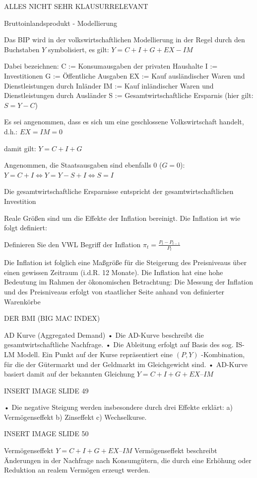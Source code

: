 ALLES NICHT SEHR KLAUSURRELEVANT

Bruttoinlandsprodukt - Modellierung

Das BIP wird in der volkswirtschaftlichen Modellierung in der Regel durch den Buchstaben \( Y \) symbolisiert, es gilt:
\(
Y = C + I + G + EX - IM
\)

Dabei bezeichnen:
C := Konsumausgaben der privaten Haushalte
I := Investitionen
G := Öffentliche Ausgaben
EX := Kauf ausländischer Waren und Dienstleistungen durch Inländer
IM := Kauf inländischer Waren und Dienstleistungen durch Ausländer
S := Gesamtwirtschaftliche Ersparnis (hier gilt: \( S = Y - C \))

Es sei angenommen, dass es sich um eine geschlossene Volkswirtschaft handelt, d.h.: \(EX = IM = 0\)

damit gilt: \(Y = C + I + G\)

Angenommen, die Staatsausgaben sind ebenfalls 0 (\( G = 0 \)): \(Y = C + I \iff Y = Y - S + I \iff S = I\)

Die gesamtwirtschaftliche Ersparnisse entspricht der
gesamtwirtschaftlichen Investition

Reale Größen sind um die Effekte der Inflation bereinigt. Die Inflation ist wie folgt definiert:


Definieren Sie den VWL Begriff der Inflation
\( \pi_t = \frac{P_t - P_{t-1}}{P_t} \)

Die Inflation ist folglich eine Maßgröße für die Steigerung des Preisniveaus über einen gewissen Zeitraum (i.d.R. 12 Monate).
Die Inflation hat eine hohe Bedeutung im Rahmen der ökonomischen Betrachtung:
Die Messung der Inflation und des Preisniveaus erfolgt von staatlicher Seite anhand von definierter Warenkörbe

DER BMI (BIG MAC INDEX)

AD Kurve (Aggregated Demand)
• Die AD-Kurve beschreibt die gesamtwirtschaftliche Nachfrage.
• Die Ableitung erfolgt auf Basis des sog. IS-LM Modell.
Ein Punkt auf der Kurse repräsentiert eine \( (P,Y) \) -Kombination, für
die der Gütermarkt und der Geldmarkt im Gleichgewicht sind.
• AD-Kurve basiert damit auf der bekannten Gleichung
\( Y = C + I + G + EX – IM \)

INSERT IMAGE SLIDE 49

• Die negative Steigung werden insbesondere durch drei Effekte erklärt:
a) Vermögenseffekt
b) Zinseffekt
c) Wechselkurse.

INSERT IMAGE SLIDE 50


Vermögenseffekt
\( Y = C + I + G + EX – IM \)
Vermögenseffekt beschreibt Änderungen in der Nachfrage nach
Konsumgütern, die durch eine Erhöhung oder Reduktion an realem
Vermögen erzeugt werden.

